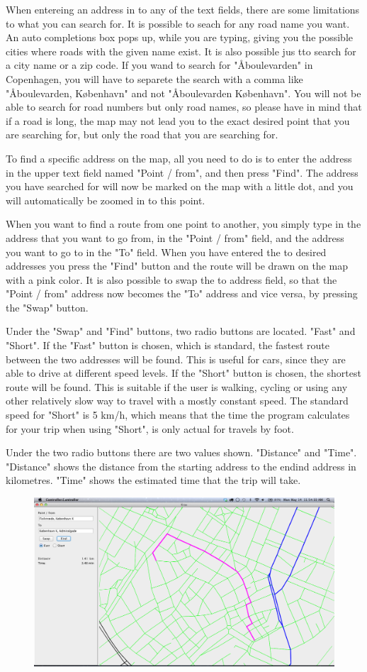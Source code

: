When entereing an address in to any of the text fields, there are some limitations to what you can search for. It is possible to seach for any road name you want. An auto completions box pops up, while you are typing, giving you the possible cities where roads with the given name exist. It is also possible jus tto search for a city name or a zip code. If you wand to search for "\AA boulevarden" in Copenhagen, you will have to separete the search with a comma like "\AA boulevarden, K\o benhavn" and not "\AA boulevarden K\o benhavn". You will not be able to search for road numbers but only road names, so please have in mind that if a road is long, the map may not lead you to the exact desired point that you are searching for, but only the road that you are searching for.

To find a specific address on the map, all you need to do is to enter the address in the upper text field named "Point / from", and then press "Find". The address you have searched for will now be marked on the map with a little dot, and you will automatically be zoomed in to this point.

When you want to find a route from one point to another, you simply type in the address that you want to go from, in the "Point / from" field, and the address you want to go to in the "To" field. When you have entered the to desired addresses you press the "Find" button and the route will be drawn on the map with a pink color. 
It is also possible to swap the to address field, so that the "Point / from" address now becomes the "To" address and vice versa, by pressing the "Swap" button.

Under the "Swap" and "Find" buttons, two radio buttons are located. "Fast" and "Short". If the "Fast" button is chosen, which is standard, the fastest route between the two addresses will be found. This is useful for cars, since they are able to drive at different speed levels. If the "Short" button is chosen, the shortest route will be found. This is suitable if the user is walking, cycling or using any other relatively slow way to travel with a mostly constant speed. The standard speed for "Short" is 5 km/h, which means that the time the program calculates for your trip when using "Short", is only actual for travels by foot.

Under the two radio buttons there are two values shown. "Distance" and "Time". "Distance" shows the distance from the starting address to the endind address in kilometres. "Time" shows the estimated time that the trip will take. 

\begin{figure}[htb]
\includegraphics{User_manual/screenshot.png}
\end{figure}
